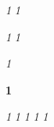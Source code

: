 \usepackage{soul}  %

\let\booktitle\textit
\soulregister\booktitle{1}
\let\book\textit
\soulregister\book{1}

\let\journaltitle\textit
\soulregister\journaltitle{1}
\let\journal\textit
\soulregister\journal{1}

\let\newspaper\textit
\soulregister\newspaper{1}

\let\vol\textbf
\soulregister\vol{1}  %

\let\latin\textit
\soulregister\latin{1}  
\let\french\textit
\soulregister\french{1}
\let\greek\textit
\soulregister\greek{1}
\let\german\textit
\soulregister\german{1}
\let\italian\textit
\soulregister\italian{1}


